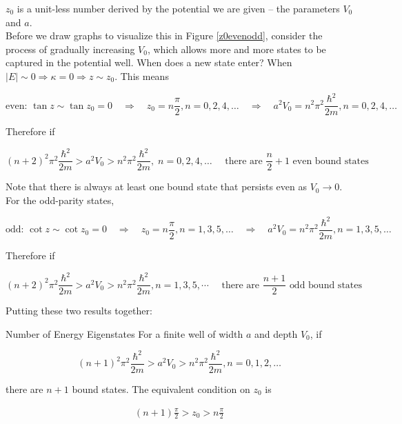 $z_0$ is a unit-less number derived by the potential we are given -- the
parameters $V_0$ and $a$. \\
Before we draw graphs to visualize this in Figure \ref{z0evenodd}, consider the process of gradually
increasing $V_0$, which allows more and more states to be captured in the
potential well. When does a new state enter? When $|E| \sim 0 \Rightarrow
\kappa = 0 \Rightarrow z \sim z_0$. This means  

\[
\text{even: } \tan z \sim \tan z_0 = 0 \quad \Rightarrow \quad z_0
= n\frac{\pi}{2}, n = 0, 2, 4, \hdots \quad \Rightarrow \quad a^2V_0 = n^2\pi^2
\frac{\hbar^2}{2m}, n = 0, 2, 4, \hdots
\] \vspace{3px}

Therefore if 

\[
  (n+2)^2\pi^2 \frac{\hbar^2}{2m} > a^2V_0 > n^2\pi^2 \frac{\hbar^2}{2m}, \;
  n = 0, 2, 4, \hdots \quad \text{ there are } \frac{n}{2} + 1 \text{ even
  bound states} 
\] \vspace{3px}

Note that there is always at least one bound state that persists even as $V_0
\to 0$. \\
For the odd-parity states, 

\[
\text{odd: } \cot z \sim \cot z_0 = 0 \quad \Rightarrow \quad z_0
= n\frac{\pi}{2}, n = 1, 3, 5, \hdots \quad \Rightarrow \quad a^2V_0 = n^2\pi^2
\frac{\hbar^2}{2m}, n = 1, 3, 5, \hdots
\] \vspace{3px}

Therefore if 

\[
  (n+2)^2 \pi^2 \frac{\hbar^2}{2m} > a^2V_0 > n^2\pi^2 \frac{\hbar^2}{2m},
  n = 1,3, 5, \cdots \quad \text{ there are } \frac{n+1}{2} \text{ odd bound
  states} 
\] \vspace{3px}

Putting these two results together: 

\begin{subbox}{Number of Energy Eigenstates}
  For a finite well of width $a$ and depth $V_0$, if

  \[
  (n+1)^2 \pi^2 \frac{\hbar^2}{2m} > a^2V_0 > n^2\pi^2
  \frac{\hbar^2}{2m}, n = 0, 1, 2, \hdots
  \] \vspace{3px}
  
  there are $n+1$ bound states. The equivalent condition on $z_0$ is 

  \begin{align} \label{finite_condition}
    (n+1)\frac{\pi}{2} > z_0 > n\frac{\pi}{2}
  \end{align} \vspace{3px}
\end{subbox}

